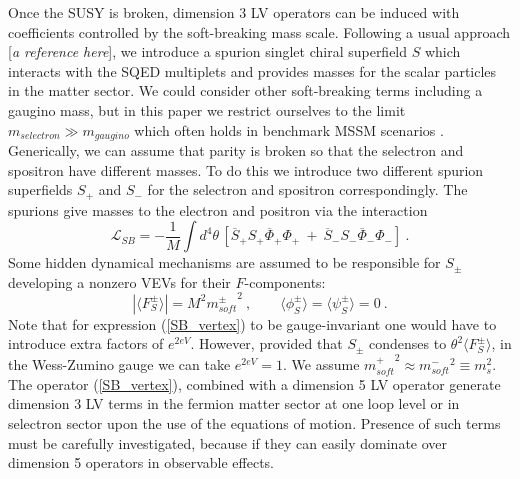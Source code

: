 \documentclass[12pt]{revtex4}
\begin{document}
Once the SUSY is broken, dimension 3 LV operators can be induced 
with coefficients controlled by the soft-breaking mass scale. 
Following a usual approach [{\it a reference here}],
we introduce a spurion singlet
chiral superfield $ S $ which interacts with the SQED
multiplets and provides masses for the scalar particles
in the matter sector. We could consider other  
    soft-breaking terms including a gaugino mass, but in this paper we restrict
ourselves to the limit  $ m_{selectron} \gg m_{gaugino}$ which often holds in 
benchmark MSSM scenarios \cite{benchmark}.
Generically, we can assume that parity is broken so that
the selectron and spositron have different masses.
To do this we introduce two different
spurion superfields $ S_+ $ and $ S_- $
for the selectron and spositron correspondingly.
The spurions give masses to the electron and positron
via the interaction
\begin{equation}
\label{SB_vertex}
  \mathcal{L}_{SB} = - \frac{1}{M} \int d^4\theta \, 
\left[\overline{S}_+ S_+ \overline{\Phi}_+ \Phi_+ 
~+~
\overline{S}_- S_- \overline{\Phi}_- \Phi_-
\right] 
~.
\end{equation}
Some hidden dynamical mechanisms are assumed to be responsible 
    for  $ S_\pm $ developing a 
nonzero VEVs for their $ F $-components:
\[
\left | \langle F^\pm_S \rangle \right | =
M^2 {m^\pm_{soft}}^2~,\qquad 
\langle\phi_S^\pm\rangle = 
\langle\psi_S^\pm\rangle = 0~.
\]
Note that for expression (\ref{SB_vertex}) to be 
gauge-invariant one would have to introduce extra factors
of $ e^{2eV} $. 
However, provided that $ S_\pm $ condenses to 
$ \theta^2 \langle F^\pm_S \rangle $,
in the Wess-Zumino gauge we can take $e^{2eV}=1$.
We assume 
$ {m_{soft}^+}^2 \approx {m_{soft}^-}^2 \equiv m_s^2 $.
The operator (\ref{SB_vertex}), 
combined with a dimension 5 LV operator
generate dimension 3 LV terms in the fermion matter sector at one loop level or 
 in selectron sector upon the use 
    of the equations of motion. 
Presence of such terms must be carefully investigated, 
because if they can easily dominate over dimension 5 operators
in observable effects.
\end{document}
